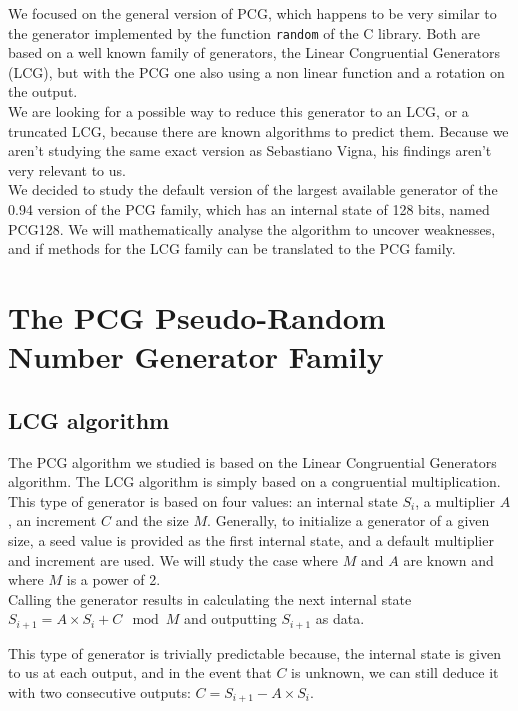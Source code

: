\documentclass[preprint]{iacrtrans}
\begin{document}
We focused on the general version of PCG, which happens to be very similar to the generator implemented by the function \texttt{random} of the C library. Both are based on a well known family of generators, the Linear Congruential Generators (LCG), but with the PCG one also using a non linear function and a rotation on the output.\\

We are looking for a possible way to reduce this generator to an LCG, or a truncated LCG, because there are known algorithms to predict them. Because we aren't studying the same exact version as Sebastiano Vigna, his findings aren't very relevant to us.\\

We decided to study the default version of the largest available generator of the 0.94 version of the PCG family, which has an internal state of 128 bits, named PCG128. We will mathematically analyse the algorithm to uncover weaknesses, and if methods for the LCG family can be translated to the PCG family.



\section{The PCG Pseudo-Random Number Generator Family}

\subsection{LCG algorithm}

The PCG algorithm we studied is based on the Linear Congruential Generators algorithm. The LCG algorithm is simply based on a congruential multiplication. This type of generator is based on four values: an internal state $S_{i}$, a multiplier $A$, an increment $C$ and the size $M$. Generally, to initialize a generator of a given size, a seed value is provided as the first internal state, and a default multiplier and increment are used. We will study the case where $M$ and $A$ are known and where $M$ is a power of 2.\\

Calling the generator results in calculating the next internal state $S_{i+1} = A \times S_i + C \mod{M}$ and outputting $S_{i+1}$ as data.

This type of generator is trivially predictable because, the internal state is given to us at each output, and in the event that $C$ is unknown, we can still deduce it with two consecutive outputs: $C = S_{i+1} - A \times S_i$.\\
\end{document}
